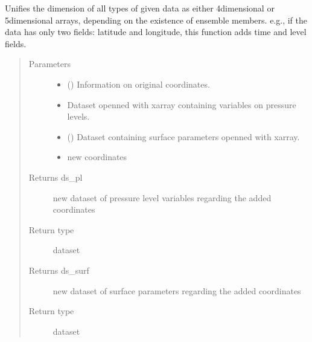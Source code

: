 \documentclass[a4paper,11pt,english]{sphinxmanual}
\begin{document}
\begin{fulllineitems}
\label{\detokenize{modules:envlib.extend_dim.extend_dimensions}}
Unifies the dimension of all types of given data as either 4\sphinxhyphen{}dimensional or 5\sphinxhyphen{}dimensional arrays, depending on
the existence of ensemble members. e.g., if the data has only two fields: latitude and longitude, this function
adds time and level fields.
\begin{quote}\begin{description}
\item[{Parameters}] \leavevmode\begin{itemize}
\item {} 
 () \textendash{} Information on original coordinates.

\item {} 
 \textendash{} Dataset openned with xarray containing variables on pressure levels.

\item {} 
 () \textendash{} Dataset containing surface parameters openned with xarray.

\item {} 
 \textendash{} new coordinates

\end{itemize}

\item[{Returns ds\_pl}] \leavevmode
new dataset of pressure level variables regarding the added coordinates

\item[{Return type}] \leavevmode
dataset

\item[{Returns ds\_surf}] \leavevmode
new dataset of surface parameters regarding the added coordinates

\item[{Return type}] \leavevmode
dataset

\end{description}\end{quote}

\end{fulllineitems}
\end{document}
